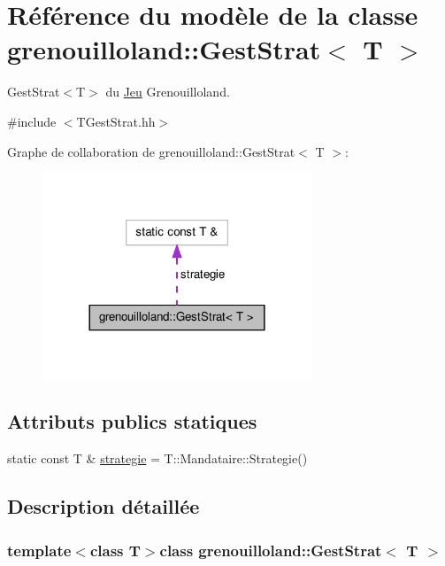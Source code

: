 \hypertarget{classgrenouilloland_1_1GestStrat}{\section{Référence du modèle de la classe grenouilloland\-:\-:Gest\-Strat$<$ T $>$}
\label{classgrenouilloland_1_1GestStrat}
}


Gest\-Strat$<$\-T$>$ du \hyperlink{classgrenouilloland_1_1Jeu}{Jeu} Grenouilloland.  




{\ttfamily \#include $<$T\-Gest\-Strat.\-hh$>$}



Graphe de collaboration de grenouilloland\-:\-:Gest\-Strat$<$ T $>$\-:
\nopagebreak
\begin{figure}[H]
\begin{center}
\leavevmode
\includegraphics[width=228pt]{classgrenouilloland_1_1GestStrat__coll__graph}
\end{center}
\end{figure}
\subsection*{Attributs publics statiques}
\begin{DoxyCompactItemize}
\item 
static const T \& \hyperlink{classgrenouilloland_1_1GestStrat_afa2982ce94250faed383990231c491bf}{strategie} = T\-::\-Mandataire\-::\-Strategie()
\end{DoxyCompactItemize}


\subsection{Description détaillée}
\subsubsection*{template$<$class T$>$class grenouilloland\-::\-Gest\-Strat$<$ T $>$}

